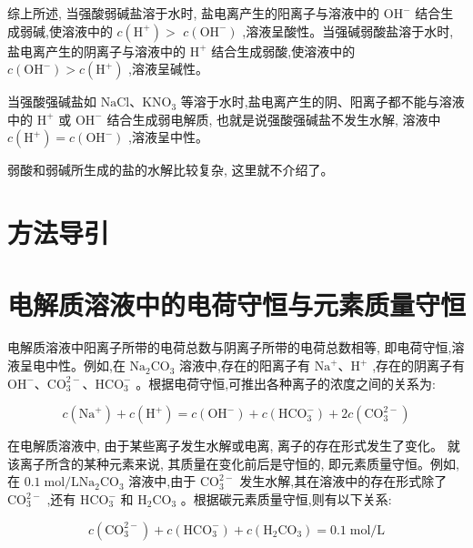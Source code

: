 \documentclass[10pt]{article}
\begin{document}
综上所述, 当强酸弱碱盐溶于水时, 盐电离产生的阳离子与溶液中的 \({\mathrm{{OH}}}^{ - }\) 结合生成弱碱,使溶液中的 \(c\left( {\mathrm{H}}^{ + }\right) >\) \(c\left( {\mathrm{{OH}}}^{ - }\right)\) ,溶液呈酸性。当强碱弱酸盐溶于水时,盐电离产生的阴离子与溶液中的 \({\mathrm{H}}^{ + }\) 结合生成弱酸,使溶液中的 \(c\left( {\mathrm{{OH}}}^{ - }\right) > c\left( {\mathrm{H}}^{ + }\right)\) ,溶液呈碱性。

当强酸强碱盐如 \(\mathrm{{NaCl}}\text{、}{\mathrm{{KNO}}}_{3}\) 等溶于水时,盐电离产生的阴、阳离子都不能与溶液中的 \({\mathrm{H}}^{ + }\) 或 \({\mathrm{{OH}}}^{ - }\) 结合生成弱电解质, 也就是说强酸强碱盐不发生水解, 溶液中 \(c\left( {\mathrm{H}}^{ + }\right) = c\left( {\mathrm{{OH}}}^{ - }\right)\) ,溶液呈中性。

弱酸和弱碱所生成的盐的水解比较复杂, 这里就不介绍了。

\section*{方法导引}

\section*{电解质溶液中的电荷守恒与元素质量守恒}

电解质溶液中阳离子所带的电荷总数与阴离子所带的电荷总数相等, 即电荷守恒,溶液呈电中性。例如,在 \({\mathrm{{Na}}}_{2}{\mathrm{{CO}}}_{3}\) 溶液中,存在的阳离子有 \({\mathrm{{Na}}}^{ + }\text{、}{\mathrm{H}}^{ + }\) ,存在的阴离子有 \({\mathrm{{OH}}}^{ - }\text{、}{\mathrm{{CO}}}_{3}^{2 - }\text{、}{\mathrm{{HCO}}}_{3}^{ - }\) 。根据电荷守恒,可推出各种离子的浓度之间的关系为:

\[
c\left( {\mathrm{{Na}}}^{ + }\right) + c\left( {\mathrm{H}}^{ + }\right) = c\left( {\mathrm{{OH}}}^{ - }\right) + c\left( {\mathrm{{HCO}}}_{3}^{ - }\right) + {2c}\left( {\mathrm{{CO}}}_{3}^{2 - }\right)
\]

在电解质溶液中, 由于某些离子发生水解或电离, 离子的存在形式发生了变化。 就该离子所含的某种元素来说, 其质量在变化前后是守恒的, 即元素质量守恒。例如,在 \({0.1}\mathrm{\;{mol}}/\mathrm{L}{\mathrm{{Na}}}_{2}{\mathrm{{CO}}}_{3}\) 溶液中,由于 \({\mathrm{{CO}}}_{3}^{2 - }\) 发生水解,其在溶液中的存在形式除了 \({\mathrm{{CO}}}_{3}^{2 - }\) ,还有 \({\mathrm{{HCO}}}_{3}^{ - }\) 和 \({\mathrm{H}}_{2}{\mathrm{{CO}}}_{3}\) 。根据碳元素质量守恒,则有以下关系:

\[
c\left( {\mathrm{{CO}}}_{3}^{2 - }\right) + c\left( {\mathrm{{HCO}}}_{3}^{ - }\right) + c\left( {{\mathrm{H}}_{2}{\mathrm{{CO}}}_{3}}\right) = {0.1}\mathrm{\;{mol}}/\mathrm{L}
\]
\end{document}
